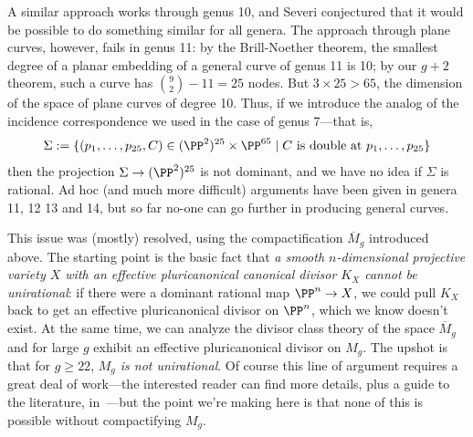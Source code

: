 A similar approach works through genus 10, and Severi conjectured that it would be possible to do something similar for all genera. The approach through plane curves, however, fails in genus 11: by the Brill-Noether theorem, the smallest degree of a planar embedding of a general curve of genus 11 is 10; by our $g+2$ theorem, such a curve has ${9\choose 2}-11 = 25$ nodes. But $3 \times 25 > 65$, the dimension of the space of plane curves of degree 10. Thus, if we introduce the analog of the incidence correspondence we used in the case of genus 7---that is,
$$
\Sigma := \{ (p_1,\dots,p_{25},C) \in (\PP^2)^{25} \times \PP^{65} \mid C \text{ is double at } p_1,\dots,p_{25} \}
$$
then the projection $\Sigma \to (\PP^2)^{25}$ is not dominant, and we have no idea if $\Sigma$ is rational.
 Ad hoc (and much more difficult) arguments have been given in genera 11, 12 13 and 14, but so far no-one can go further in producing general curves. 
 
 This issue was (mostly) resolved, using the compactification $\overline M_g$ introduced above. The starting point is the basic fact that \emph{a smooth $n$-dimensional projective variety $X$ with an effective pluricanonical canonical divisor $K_X$ cannot be unirational}: if there were a dominant rational map $\PP^n \to X$, we could pull $K_X$ back to get an effective pluricanonical divisor on $\PP^n$, which we know doesn't exist. At the same time, we can analyze the divisor class theory of the space $\overline M_g$ and for large $g$ exhibit an effective pluricanonical divisor on $M_g$. The upshot is that for $g \geq 22$, \emph{$M_g$ is not unirational}. Of course this line of argument requires a great deal of work---the interested reader can find more details, plus a guide to the literature, in~\cite{Harris-Morrison}---but the point we're making here is that none of this is possible without compactifying $M_g$.

